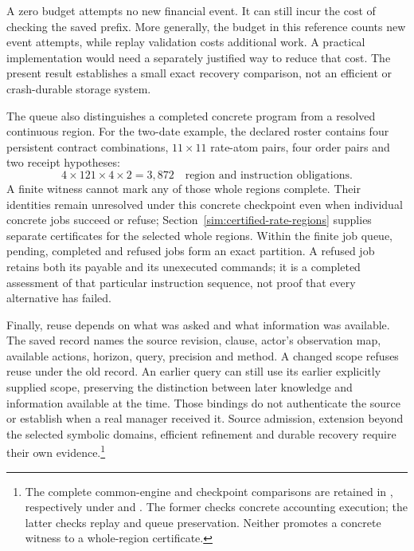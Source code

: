 A zero budget attempts no new financial event. It can still incur the cost of checking the saved prefix. More generally, the budget in this reference counts new event attempts, while replay validation costs additional work. A practical implementation would need a separately justified way to reduce that cost. The present result establishes a small exact recovery comparison, not an efficient or crash-durable storage system.

The queue also distinguishes a completed concrete program from a resolved continuous region. For the two-date example, the declared roster contains four persistent contract combinations, $11\times11$ rate-atom pairs, four order pairs and two receipt hypotheses:
\begin{equation}
 4\times121\times4\times2=3{,}872
 \quad\text{region and instruction obligations}.
\end{equation}
A finite witness cannot mark any of those whole regions complete. Their identities remain unresolved under this concrete checkpoint even when individual concrete jobs succeed or refuse; Section~\ref{sim:certified-rate-regions} supplies separate certificates for the selected whole regions. Within the finite job queue, pending, completed and refused jobs form an exact partition. A refused job retains both its payable and its unexecuted commands; it is a completed assessment of that particular instruction sequence, not proof that every alternative has failed.

Finally, reuse depends on what was asked and what information was available. The saved record names the source revision, clause, actor's observation map, available actions, horizon, query, precision and method. A changed scope refuses reuse under the old record. An earlier query can still use its earlier explicitly supplied scope, preserving the distinction between later knowledge and information available at the time. Those bindings do not authenticate the source or establish when a real manager received it. Source admission, extension beyond the selected symbolic domains, efficient refinement and durable recovery require their own evidence.\footnote{The complete common-engine and checkpoint comparisons are retained in , respectively under  and . The former checks concrete accounting execution; the latter checks replay and queue preservation. Neither promotes a concrete witness to a whole-region certificate.}
